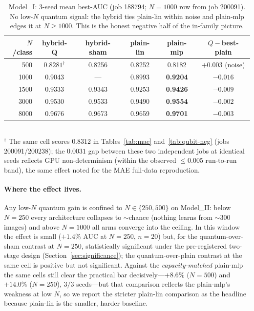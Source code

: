 \documentclass[10pt,letterpaper]{article}
\theoremstyle{plain}
\theoremstyle{definition}
\newcommand{\win}[1]{\textcolor{good}{\textbf{#1}}}
\newcommand{\lose}[1]{\textcolor{bad}{#1}}
\begin{document}
\begin{table}[h!]
\centering
\caption{Model\_I: $3$-seed mean best-AUC (job 188794; $N{=}1000$ row from job
200091). No low-$N$ quantum signal: the hybrid ties plain-lin within noise and
plain-mlp edges it at $N\geq1000$. This is the honest negative half of the
in-family picture.}
\label{tab:hybrid-I}
\begin{tabular}{@{}rccccc@{}}
\toprule
$N$/class & hybrid-Q & hybrid-sham & plain-lin & plain-mlp & $Q-$best-plain \\
\midrule
500  & $0.8281^{\dagger}$ & 0.8256 & 0.8252 & 0.8182 & $+0.003$ (noise) \\
1000 & 0.9043 & --- & 0.8993 & \win{0.9204} & \lose{$-0.016$} \\
1500 & 0.9333 & 0.9343 & 0.9253 & \win{0.9426} & \lose{$-0.009$} \\
3000 & 0.9530 & 0.9533 & 0.9490 & \win{0.9554} & \lose{$-0.002$} \\
8000 & 0.9676 & 0.9673 & 0.9659 & \win{0.9701} & \lose{$-0.003$} \\
\bottomrule
\end{tabular}\\[2pt]
{\footnotesize $^{\dagger}$ The same cell scores $0.8312$ in
Tables~\ref{tab:mae} and~\ref{tab:qubit-neg} (jobs 200091/200238); the $0.0031$
gap between these two independent jobs at identical seeds reflects GPU
non-determinism (within the observed $\leq 0.005$ run-to-run band), the same
effect noted for the MAE full-data reproduction.}
\end{table}

\paragraph{Where the effect lives.}
Any low-$N$ quantum gain is confined to $N\in\{250,500\}$ on Model\_II: below
$N{=}250$ every architecture collapses to $\sim$chance (nothing learns from
$\sim$300 images) and above $N{=}1000$ all arms converge into the ceiling. In this
window the effect is small ($+1.4\%$ AUC at $N{=}250$, $n{=}20$) but, for the
quantum-over-sham contrast at $N{=}250$, statistically significant under the
pre-registered two-stage design (Section~\ref{sec:significance}); the
quantum-over-plain contrast at the same cell is positive but not significant.
Against the \emph{capacity-matched}
plain-mlp the same cells still clear the practical bar decisively---$+8.6\%$
($N{=}500$) and $+14.0\%$ ($N{=}250$), $3/3$ seeds---but that comparison reflects
the plain-mlp's weakness at low $N$, so we report the stricter plain-lin
comparison as the headline because plain-lin is the smaller, harder baseline.
\end{document}
